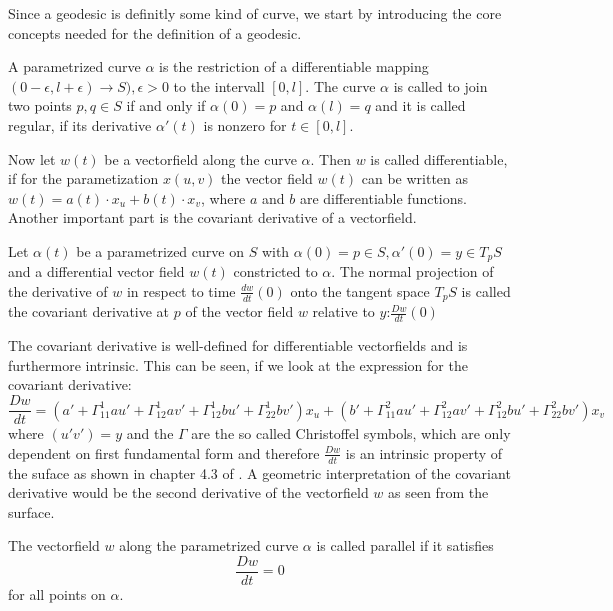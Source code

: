 Since a geodesic is definitly some kind of curve, we start by introducing the core concepts needed for the definition of a geodesic.
\begin{mydef}
	A parametrized curve $\alpha$ is the restriction of a differentiable mapping $( 0-\epsilon, l+\epsilon) \rightarrow S), \epsilon > 0$ to the intervall $[0,l]$.
	The curve $\alpha$ is called to join two points $p,q \in S$ if and only if $\alpha(0) = p$ and $\alpha(l) = q$ and it is called regular, if its derivative $\alpha'(t)$ is nonzero for $t \in [0,l]$.
\end{mydef}
Now let $w(t)$ be a vectorfield along the curve $\alpha$.
Then $w$ is called differentiable, if for the parametization $x(u,v)$ the vector field $w(t)$ can be written as $w(t) = a(t) \cdot x_u + b(t) \cdot x_v$, where $a$ and $b$ are differentiable functions.
Another important part is the covariant derivative of a vectorfield.
\begin{mydef}
	Let $\alpha(t)$ be a parametrized curve on $S$ with $\alpha(0) = p \in S, \alpha'(0) = y \in T_pS$ and a differential vector field $w(t)$ constricted to $\alpha$.
	The normal projection of the derivative of $w$ in respect to time $\frac{dw}{dt}(0)$ onto the tangent space $T_pS$ is called the covariant derivative at $p$ of the vector field $w$ relative to $y$:$\frac{Dw}{dt}(0)$
\end{mydef}
The covariant derivative is well-defined for differentiable vectorfields and is furthermore intrinsic.
This can be seen, if we look at the expression for the covariant derivative:
$$\frac{Dw}{dt} = (a' + \Gamma^{1}_{1 1} a u' + \Gamma^{1}_{1 2} a v' + \Gamma^{1}_{1 2} b u' + \Gamma^{1}_{2 2} b v')x_u + (b' + \Gamma^{2}_{1 1} a u' + \Gamma^{2}_{1 2} a v' + \Gamma^{2}_{1 2} b u' + \Gamma^{2}_{2 2} b v')x_v$$
where $(u' v') = y$  and the $\Gamma$ are the so called Christoffel symbols, which are only dependent on first fundamental form and therefore $\frac{Dw}{dt}$ is an intrinsic property of the suface as shown in chapter 4.3 of \cite{do1976differential}.
A geometric interpretation of the covariant derivative would be the second derivative of the vectorfield $w$ as seen from the surface.
\begin{mydef}
	The vectorfield $w$ along the parametrized curve $\alpha$ is called parallel if it satisfies
	$$\frac{Dw}{dt} = 0 $$
	for all points on $\alpha$.
\end{mydef}

